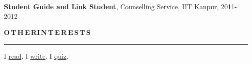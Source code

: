 \documentclass[11pt, a4paper]{article}
\begin{document}
\vspace{2pt}

\textbf{Student Guide and Link Student}, Counselling Service, IIT Kanpur, 2011-2012

\vspace{8pt}
\textbf{O\,T\,H\,E\,R{\hspace{0.6em}}I\,N\,T\,E\,R\,E\,S\,T\,S}
\vspace{5pt}
\hrule
\vspace{7pt}
I \href{https://www.goodreads.com/user/show/25100820-ankan-bansal}{read}. I
\href{https://computervizion.blogspot.com/}{write}. I
\href{https://www.slideshare.net/AnkanBansal}{quiz}. %

\end{document}
